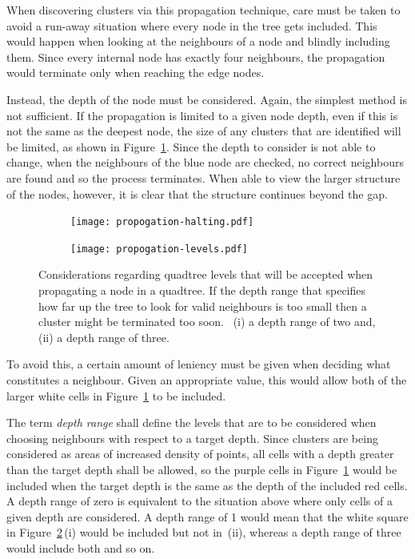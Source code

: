 When discovering clusters via this propagation technique, care must be taken to
avoid a run-away situation where every node in the tree gets included. This
would happen when looking at the neighbours of a node and blindly including
them. Since every internal node has exactly four neighbours, the propagation
would terminate only when reaching the edge nodes.

Instead, the depth of the node must be considered. Again, the simplest method
is not sufficient. If the propagation is limited to a given node depth, even if
this is not the same as the deepest node, the size of any clusters that are
identified will be limited, as shown in Figure~\ref{fig:propogation-halting}.
Since the depth to consider is not able to change, when the neighbours of the
blue node are checked, no correct neighbours are found and so the process
terminates. When able to view the larger structure of the nodes, however, it is
clear that the structure continues beyond the gap.

\begin{figure}[tbhp]
	\centering
	\begin{subfigure}[c]{5.2cm}
		\texttt{[image: propogation-halting.pdf]}
		\caption{}\label{fig:propogation-halting}
	\end{subfigure}%
	\quad
	\begin{subfigure}[c]{3.2cm}
		\texttt{[image: propogation-levels.pdf]}
		\caption{}\label{fig:propogation-levels}
	\end{subfigure}

	\caption[Considerations regarding quadtree levels to be
	accepted.]{Considerations regarding quadtree levels that will be accepted
		when propagating a node in a quadtree. 
		If the depth range that specifies how far up the tree to look for valid
		neighbours is too small then a cluster might be terminated too soon.
		~(i) a depth range of two and, (ii) a
		depth range of three.}\label{fig:prop-levels-halting}
\end{figure}

To avoid this, a certain amount of leniency must be given when deciding what
constitutes a neighbour. Given an appropriate value, this would allow both of
the larger white cells in Figure~\ref{fig:propogation-halting} to be included.

The term \emph{depth range} shall define the levels that are to be considered
when choosing neighbours with respect to a target depth. Since clusters are
being considered as areas of increased density of points, all cells with a
depth greater than the target depth shall be allowed, so the purple cells in
Figure~\ref{fig:propogation-halting} would be included when the target depth is
the same as the depth of the included red cells. A depth range of zero is
equivalent to the situation above where only cells of a given depth are
considered. A depth range of 1 would mean that the white square in
Figure~\ref{fig:propogation-levels}\,(i) would be included but not in~(ii),
whereas a depth range of three would include both and so on.

